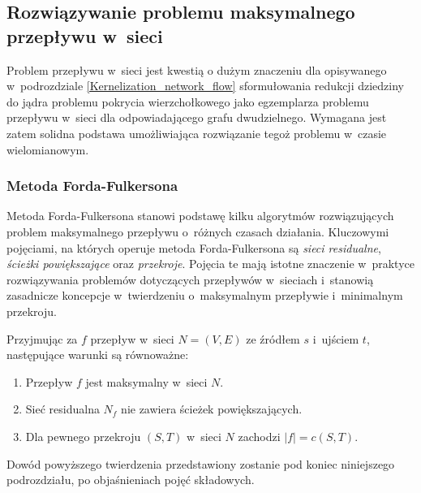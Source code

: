 \subsection{Rozwiązywanie problemu maksymalnego przepływu w~sieci}\label{ss_max_flow}
\par{
  Problem przepływu w~sieci jest kwestią o dużym znaczeniu dla opisywanego w~podrozdziale \ref{Kernelization_network_flow} sformułowania redukcji dziedziny do jądra problemu pokrycia wierzchołkowego jako egzemplarza problemu przepływu w~sieci dla odpowiadającego grafu dwudzielnego. 
  Wymagana jest zatem solidna podstawa umożliwiająca rozwiązanie tegoż problemu w~czasie wielomianowym.
}
\subsubsection{\textbf{Metoda Forda-Fulkersona}}
\par{
  Metoda Forda-Fulkersona stanowi podstawę kilku algorytmów rozwiązujących problem maksymalnego przepływu o~różnych czasach działania.
  Kluczowymi pojęciami, na których operuje metoda Forda-Fulkersona są \emph{sieci residualne}, \emph{ścieżki powiększające} oraz \emph{przekroje}.
  Pojęcia te mają istotne znaczenie w~praktyce rozwiązywania problemów dotyczących przepływów w~sieciach i~stanowią zasadnicze koncepcje w~twierdzeniu o~maksymalnym przepływie i~minimalnym przekroju.
  \begin{theorem}
    Przyjmując za $f$ przepływ w~sieci $N=(V,E)$ ze źródłem $s$ i~ujściem $t$, następujące warunki są równoważne:
    \begin{enumerate}[(1)]
      \item Przepływ $f$ jest maksymalny w~sieci $N$.
      \item Sieć residualna $N_f$ nie zawiera ścieżek powiększających.
      \item Dla pewnego przekroju $(S, T)$ w~sieci $N$ zachodzi $|f|=c(S,T)$.
    \end{enumerate}
  \end{theorem}
  Dowód powyższego twierdzenia przedstawiony zostanie pod koniec niniejszego podrozdziału, po objaśnieniach pojęć składowych.
}

